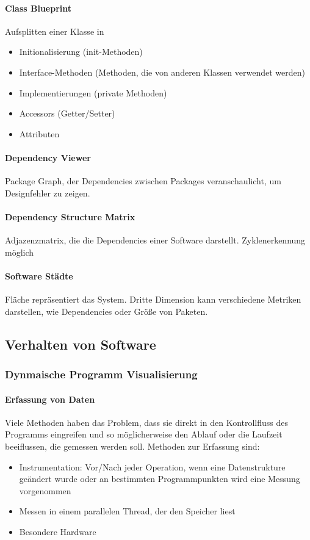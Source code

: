 \documentclass[ngerman]{scrartcl}
\begin{document}
\paragraph{Class Blueprint} Aufsplitten einer Klasse in
\begin{itemize}
  \item Initionalisierung (init-Methoden)
  \item Interface-Methoden (Methoden, die von anderen Klassen verwendet werden)
  \item Implementierungen (private Methoden)
  \item Accessors (Getter/Setter)
  \item Attributen
\end{itemize}

\paragraph{Dependency Viewer} Package Graph, der Dependencies zwischen Packages veranschaulicht, um Designfehler zu zeigen.

\paragraph{Dependency Structure Matrix} Adjazenzmatrix, die die Dependencies einer Software darstellt. Zyklenerkennung möglich

\paragraph{Software Städte} Fläche repräsentiert das System. Dritte Dimension kann verschiedene Metriken darstellen, wie Dependencies oder Größe von Paketen.



\subsection{Verhalten von Software}

\subsubsection{Dynmaische Programm Visualisierung}

\paragraph{Erfassung von Daten} Viele Methoden haben das Problem, dass sie direkt in den Kontrollfluss des Programms eingreifen und so möglicherweise den Ablauf oder die Laufzeit beeiflussen, die gemessen werden soll. Methoden zur Erfassung sind:
\begin{itemize}
  \item Instrumentation: Vor/Nach jeder Operation, wenn eine Datenstrukture geändert wurde oder an bestimmten Programmpunkten wird eine Messung vorgenommen
  \item Messen in einem parallelen Thread, der den Speicher liest
  \item Besondere Hardware
\end{itemize}
\end{document}
